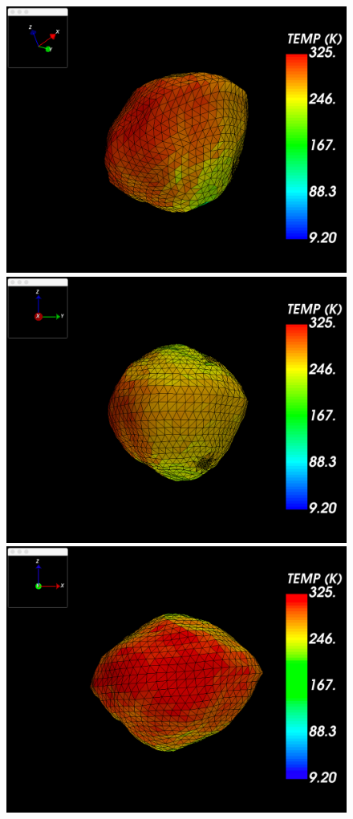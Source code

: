 \begin{figure}[t]
    \center
	\includegraphics[width=0.3\linewidth]{rsc/HO3_3D_normalspeed}
	\includegraphics[width=0.3\linewidth]{rsc/HO3_Xaxis_normalspeed}
	\includegraphics[width=0.3\linewidth]{rsc/HO3_Yaxis_normalspeed}
    \label{fig:7.3}
\end{figure}
